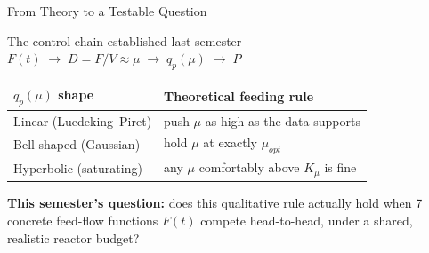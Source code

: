 \documentclass[aspectratio=169, 11pt]{beamer}
\begin{document}
\begin{frame}{From Theory to a Testable Question}
  \begin{block}{The control chain established last semester}
    \centering
    $F(t) \;\rightarrow\; D = F/V \approx \mu \;\rightarrow\; q_p(\mu) \;\rightarrow\; P$
  \end{block}

  \vspace{0.3cm}
  \begin{center}
  \renewcommand{\arraystretch}{1.3}
  \begin{tabular}{ll}
    \toprule
    \textbf{$q_p(\mu)$ shape} & \textbf{Theoretical feeding rule} \\
    \midrule
    Linear (Luedeking--Piret) & push $\mu$ as high as the data supports \\
    Bell-shaped (Gaussian) & hold $\mu$ at exactly $\mu_{opt}$ \\
    Hyperbolic (saturating) & any $\mu$ comfortably above $K_\mu$ is fine \\
    \bottomrule
  \end{tabular}
  \end{center}

  \vspace{0.3cm}
  \textbf{This semester's question:} does this qualitative rule actually hold when
  7 concrete feed-flow functions $F(t)$ compete head-to-head, under a shared,
  realistic reactor budget?
\end{frame}
\end{document}
